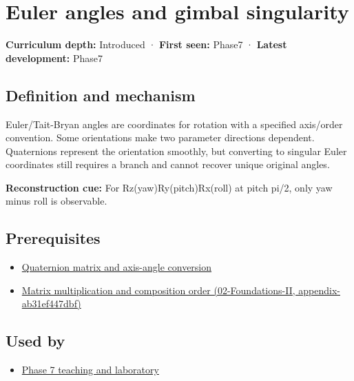 \hypertarget{appendix-5f723fbd0593}{}
\section{Euler angles and gimbal singularity}\label{appendix-5f723fbd0593-euler-angles-and-gimbal-singularity}

\textbf{Curriculum depth:} Introduced · \textbf{First seen:} Phase7 · \textbf{Latest development:} Phase7

\subsection{Definition and mechanism}\label{appendix-5f723fbd0593-definition-and-mechanism}

Euler/Tait-Bryan angles are coordinates for rotation with a specified axis/order convention. Some orientations make two parameter directions dependent. Quaternions represent the orientation smoothly, but converting to singular Euler coordinates still requires a branch and cannot recover unique original angles.

\textbf{Reconstruction cue:} For Rz(yaw)Ry(pitch)Rx(roll) at pitch pi/2, only yaw minus roll is observable.

\subsection{Prerequisites}\label{appendix-5f723fbd0593-prerequisites}

\begin{itemize}
\tightlist
\item
  \hyperref[appendix-26d8da71f6c4]{Quaternion matrix and axis-angle conversion}
\item
  \href{../02-Foundations-II/main.pdf\#nameddest=appendix-ab31ef447dbf}{Matrix multiplication and composition order (02-Foundations-II, appendix-ab31ef447dbf)}
\end{itemize}

\subsection{Used by}\label{appendix-5f723fbd0593-used-by}

\begin{itemize}
\tightlist
\item
  \hyperref[01-foundations-i-ch018-keep-the-promises-visible-while-moving-between-representations]{Phase 7 teaching and laboratory}
\end{itemize}

